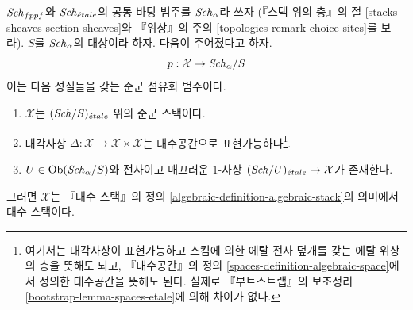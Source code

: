 \begin{lemma}
\label{lemma-stacks-etale}
$\mathit{Sch}_{fppf}$와 $\mathit{Sch}_{\acute{e}tale}$의 공통 바탕 범주를 $\mathit{Sch}_\alpha$라 쓰자
(『스택 위의 층』의 절 \ref{stacks-sheaves-section-sheaves}와
『위상』의 주의 \ref{topologies-remark-choice-sites}를 보라).
$S$를 $\mathit{Sch}_\alpha$의 대상이라 하자. 다음이 주어졌다고 하자.
$$
p : \mathcal{X} \to \mathit{Sch}_\alpha/S
$$
이는 다음 성질들을 갖는 준군 섬유화 범주이다.
\begin{enumerate}
\item $\mathcal{X}$는 $(\mathit{Sch}/S)_{\acute{e}tale}$ 위의 준군 스택이다.
\item 대각사상 $\Delta : \mathcal{X} \to \mathcal{X} \times \mathcal{X}$는
대수공간으로 표현가능하다\footnote{여기서는 대각사상이 표현가능하고
스킴에 의한 에탈 전사 덮개를 갖는 에탈 위상의 층을 뜻해도 되고,
『대수공간』의 정의 \ref{spaces-definition-algebraic-space}에서 정의한
대수공간을 뜻해도 된다. 실제로 『부트스트랩』의 보조정리
\ref{bootstrap-lemma-spaces-etale}에 의해 차이가 없다.}.
\item $U \in \mathop{\mathrm{Ob}}\nolimits(\mathit{Sch}_\alpha/S)$와 전사이고 매끄러운 $1$-사상
$(\mathit{Sch}/U)_{\acute{e}tale} \to \mathcal{X}$가 존재한다.
\end{enumerate}
그러면 $\mathcal{X}$는 『대수 스택』의 정의
\ref{algebraic-definition-algebraic-stack}의 의미에서 대수 스택이다.
\end{lemma}

